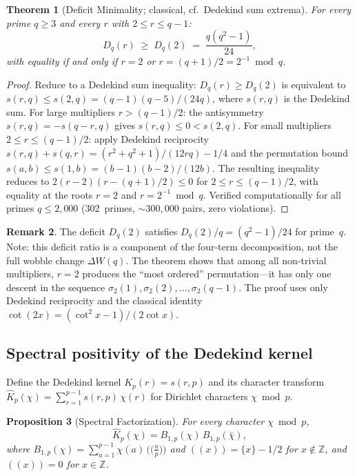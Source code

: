 \documentclass[11pt]{article}
\newtheorem{theorem}{Theorem}[section]
\newtheorem{proposition}[theorem]{Proposition}
\theoremstyle{definition}
\newtheorem{remark}[theorem]{Remark}
\newcommand{\Z}{\mathbb{Z}}
\begin{document}
\begin{theorem}[Deficit Minimality; classical, cf.\ Dedekind sum extrema]
For every prime $q \ge 3$ and every $r$ with $2 \le r \le q-1$:
\begin{equation}
  D_q(r) \;\ge\; D_q(2) \;=\; \frac{q(q^2-1)}{24},
\end{equation}
with equality if and only if $r = 2$ or
$r = (q+1)/2 = 2^{-1} \bmod q$.
\end{theorem}

\begin{proof}
Reduce to a Dedekind sum inequality: $D_q(r) \ge D_q(2)$
is equivalent to $s(r,q) \le s(2,q) = (q-1)(q-5)/(24q)$,
where $s(r,q)$ is the Dedekind sum.
For large multipliers $r > (q-1)/2$: the antisymmetry
$s(r,q) = -s(q-r,q)$ gives $s(r,q) \le 0 < s(2,q)$.
For small multipliers $2 \le r \le (q-1)/2$: apply Dedekind
reciprocity $s(r,q) + s(q,r) = (r^2+q^2+1)/(12rq) - 1/4$
and the permutation bound $s(a,b) \le s(1,b) = (b-1)(b-2)/(12b)$.
The resulting inequality reduces to
$2(r - 2)(r - (q+1)/2) \le 0$
for $2 \le r \le (q-1)/2$, with equality at the roots
$r = 2$ and $r = 2^{-1} \bmod q$.
Verified computationally for all primes $q \le 2{,}000$
(302~primes, ${\sim}300{,}000$ pairs, zero violations).
\end{proof}

\begin{remark}
The deficit $D_q(2)$ satisfies $D_q(2)/q = (q^2-1)/24$ for
prime~$q$.  Note: this deficit ratio is a component of the
four-term decomposition, not the full wobble change $\Delta W(q)$.  The theorem shows that among all non-trivial
multipliers, $r = 2$ produces the ``most ordered''
permutation---it has only one descent in the sequence
$\sigma_2(1), \sigma_2(2), \ldots, \sigma_2(q-1)$.
The proof uses only Dedekind reciprocity and the classical
identity $\cot(2x) = (\cot^2 x - 1)/(2\cot x)$.
\end{remark}

\subsection{Spectral positivity of the Dedekind kernel}

Define the Dedekind kernel $K_p(r) = s(r,p)$ and its
character transform
$\hat{K}_p(\chi) = \sum_{r=1}^{p-1} s(r,p)\,\chi(r)$
for Dirichlet characters $\chi \bmod p$.

\begin{proposition}[Spectral Factorization]
For every character $\chi \bmod p$,
\[
  \hat{K}_p(\chi) = B_{1,p}(\chi)\,B_{1,p}(\bar{\chi}),
\]
where $B_{1,p}(\chi) = \sum_{a=1}^{p-1}\chi(a)\,\bigl(\!\bigl(\tfrac{a}{p}\bigr)\!\bigr)$
and $((x)) = \{x\} - 1/2$ for $x \notin \Z$, and $((x)) = 0$ for $x \in \Z$.
\end{proposition}
\end{document}
